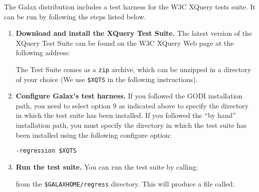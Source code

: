 The Galax distribution includes a test harness for the W3C XQuery
tests suite. It can be run by following the steps listed below.

\begin{enumerate}
\item {\bf Download and install the XQuery Test Suite.} The latest
version of the XQuery Test Suite can be found on the W3C XQuery Web
page at the following address:


The Test Suite comes as a \verb+zip+ archive, which can be unzipped in
a directory of your choice (We use \verb+$XQTS+ in the following
instructions).
\item {\bf Configure Galax's test harness.} If you followed the GODI
installation path, you need to select option 9 as indicated above to
specify the directory in which the test suite has been installed. If
you followed the ``by hand'' installation path, you must specify the
directory in which the test suite has been installed using the
following configure option:
\begin{verbatim}
-regression $XQTS
\end{verbatim}
\item {\bf Run the test suite.} You can run the test suite by
calling:


from the \verb+$GALAXHOME/regress+ directory. This will produce a file
called:



\end{enumerate}

